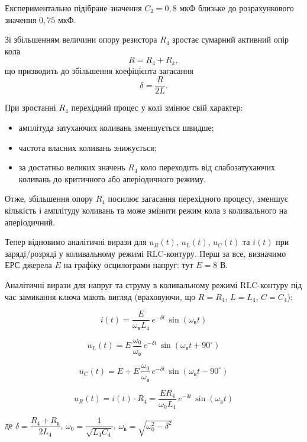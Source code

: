 \documentclass[12pt,a4paper]{article}
\begin{document}
    Експериментально підібране значення $C_2 = 0{,}8$ мкФ близьке до розрахункового значення $0{,}75$ мкФ.

    Зі збільшенням величини опору резистора $R_4$ зростає сумарний активний опір кола 
    \[
    R = R_4 + R_k,
    \]
    що призводить до збільшення коефіцієнта загасання
    \[
    \delta = \frac{R}{2L}.
    \]

    \noindent
    При зростанні $R_4$ перехідний процес у колі змінює свій характер:
    \begin{itemize}
        \item амплітуда затухаючих коливань зменшується швидше;
        \item частота власних коливань знижується;
        \item за достатньо великих значень $R_4$ коло переходить від слабозатухаючих коливань до критичного або аперіодичного режиму.
    \end{itemize}

    Отже, збільшення опору $R_4$ посилює загасання перехідного процесу, зменшує кількість і амплітуду коливань та може змінити режим кола з коливального на аперіодичний.

    \vspace{1em}

    Тепер відновимо аналітичні вирази для $u_R(t)$, $u_L(t)$, $u_C(t)$ та $i(t)$ при заряді/розряді у коливальному режимі RLC-контуру.
    Перш за все, визначимо ЕРС джерела $E$ на графіку осцилограми напруг: тут $E = 8$ В.

    Аналітичні вирази для напруг та струму в коливальному режимі RLC-контуру під час замикання ключа мають вигляд (враховуючи, що $R = R_4$, $L = L_4$, $C = C_4$):

    \[
    i(t) = \frac{E}{\omega_{\text{в}} L_4}\, e^{-\delta t}\, \sin(\omega_{\text{в}} t)
    \]

    \[
    u_L(t) = E\,\frac{\omega_0}{\omega_{\text{в}}}\, e^{-\delta t}\, \sin(\omega_{\text{в}} t + 90^\circ)
    \]

    \[
    u_{C}(t) = E + E\,\frac{\omega_0}{\omega_{\text{в}}}\, e^{-\delta t}\, \sin(\omega_{\text{в}} t - 90^\circ)
    \]

    \[
    u_R(t) = i(t) \cdot R_4 = \frac{ER_4}{\omega_0 L_4}\, e^{-\delta t}\, \sin(\omega_{\text{в}} t)
    \]

    де $\delta = \dfrac{R_4+R_{\text{к}}}{2L_4}$, $\omega_0 = \dfrac{1}{\sqrt{L_4C_4}}$, $\omega_{\text{в}} = \sqrt{\omega_0^2 - \delta^2}$
\end{document}
